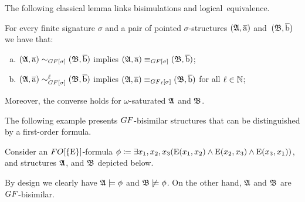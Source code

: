 The following classical lemma links bisimulations and logical~equivalence.
\begin{lemma}\label{lemma:GF-bisimulations-work-well}
For every finite signature $\sigma$ and a pair of pointed $\sigma$-structures $({\mathfrak{A}}, \overline{\mathrm{a}})$ and~$({\mathfrak{B}}, \overline{\mathrm{b}})$ we have that:
\begin{enumerate}[(a)]
\item $(\str{A}, \elemtuplea) \bisimto_{\GF[\sigma]} (\str{B}, \elemtupleb)$ implies $(\str{A}, \elemtuplea) \equiv_{\GF[\sigma]} (\str{B}, \elemtupleb)$;
\item $(\str{A}, \elemtuplea) \bisimto_{\GF[\sigma]}^{\ell} (\str{B}, \elemtupleb)$ implies $(\str{A}, \elemtuplea) \equiv_{\GF_\ell[\sigma]} (\str{B}, \elemtupleb)$ for all $\ell \in {\mathbb{N}}$;
\end{enumerate}
Moreover, the converse holds for $\omega$-saturated ${\mathfrak{A}}$ and ${\mathfrak{B}}$.
\end{lemma}

The following example presents $\GF$-bisimilar structures that can be distinguished by a first-order formula.
\begin{example}
  Consider an $\FO[\{\relE\}]$-formula $\phi \coloneqq \exists{x_{1}, x_{2}, x_{3}}(\mathrm{E}(x_{1}, x_{2}) \land \mathrm{E}(x_{2}, x_{3}) \land \mathrm{E}(x_{3}, x_{1}))$, and structures ${\mathfrak{A}}$, and ${\mathfrak{B}}$ depicted below. 
  \begin{figure}[H]
  \centering
  \end{figure}
  By design we clearly have ${\mathfrak{A}}\models \phi$ and ${\mathfrak{B}} \not\models \phi$. On the other hand, ${\mathfrak{A}}$ and ${\mathfrak{B}}$ are $\GF$-bisimilar.
\end{example}

